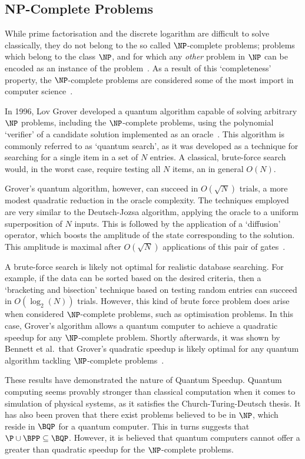 \documentclass{standalone}
\begin{document}
\subsection{NP-Complete Problems}\label{sec:notNP}
While prime factorisation and the discrete logarithm are difficult to solve classically, they do not belong to the so called $\NP$-complete problems; problems which belong to the class $\NP$, and for which any \emph{other} problem in $\NP$ can be encoded as an instance of the problem~\cite{ComplexityZoo}. As a result of this `completeness' property, the $\NP$-complete problems are considered some of the most import in computer science~\cite{Bennett1997}.
\par
In 1996, Lov Grover developed a quantum algorithm capable of solving arbitrary $\NP$ problems, including the $\NP$-complete problems, using the polynomial `verifier' of a candidate solution implemented as an oracle~\cite{Grover1996}. This algorithm is commonly referred to as `quantum search', as it was developed as a technique for searching for a single item in a set of $N$ entries. A classical, brute-force search would, in the worst case, require testing all $N$ items, an in general $O(N)$. 
\par
Grover's quantum algorithm, however, can succeed in $O(\sqrt{N})$ trials, a more modest quadratic reduction in the oracle complexity. The techniques employed are very similar to the Deutsch-Jozsa algorithm, applying the oracle to a uniform superposition of $N$ inputs. This is followed by the application of a `diffusion' operator, which boosts the amplitude of the state corresponding to the solution. This amplitude is maximal after $O(\sqrt{N})$ applications of this pair of gates~\cite{Grover1996}.
\par
A brute-force search is likely not optimal for realistic database searching. For example, if the data can be sorted based on the desired criteria, then a `bracketing and bisection' technique based on testing random entries can succeed in $O(\log_{2}(N))$ trials. However, this kind of brute force problem does arise when considered $\NP$-complete problems, such as optimisation problems. In this case, Grover's algorithm allows a quantum computer to achieve a quadratic speedup for any $\NP$-complete problem. Shortly afterwards, it was shown by Bennett et al.\ that Grover's quadratic speedup is likely optimal for any quantum algorithm tackling $\NP$-complete problems~\cite{Bennett1997}.
\par
These results have demonstrated the nature of Quantum Speedup. Quantum computing seems provably stronger than classical computation when it comes to simulation of physical systems, as it satisfies the Church-Turing-Deutsch thesis. It has also been proven that there exist problems believed to be in $\NP$, which reside in $\BQP$ for a quantum computer. This in turns suggests that$\P\cup\BPP\subseteq\BQP$. However, it is believed that quantum computers cannot offer a greater than quadratic speedup for the $\NP$-complete problems. 
\end{document}
